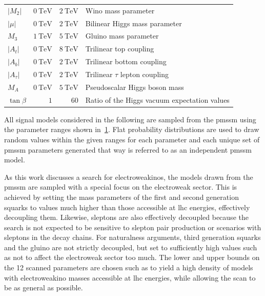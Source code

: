 \begin{table}
\begin{tabular} {l r r l}
		$\vert M_2\vert$ & $\SI{0}{\TeV}$ & $\SI{2}{\TeV}$ & Wino mass parameter \\
		$\vert\mu\vert$ & $\SI{0}{\TeV}$ & $\SI{2}{\TeV}$ & Bilinear Higgs mass parameter \\
		$M_3$ & $\SI{1}{\TeV}$ & $\SI{5}{\TeV}$ & Gluino mass parameter \\
		\midrule
		$\vert A_t\vert$ & $\SI{0}{\TeV}$ & $\SI{8}{\TeV}$ & Trilinear top coupling \\
		$\vert A_b\vert$ & $\SI{0}{\TeV}$ & $\SI{2}{\TeV}$ & Trilinear bottom coupling \\
		$\vert A_\tau\vert$ & $\SI{0}{\TeV}$ & $\SI{2}{\TeV}$ & Trilinear $\tau$ lepton coupling \\
		$M_A$ & $\SI{0}{\TeV}$ & $\SI{5}{\TeV}$ & Pseudoscalar Higgs boson mass \\
		$\tan\beta$ & $1$ & $60$ & Ratio of the Higgs vacuum expectation values \\
		\bottomrule
	\end{tabular}

	\label{fig:pmssm_scan_ranges}   
\end{table}

All signal models considered in the following are sampled from the \gls{pmssm} using the parameter ranges shown in~\cref{fig:pmssm_scan_ranges}. Flat probability distributions are used to draw random values within the given ranges for each parameter and each unique set of \gls{pmssm} parameters generated that way is referred to as an independent \gls{pmssm} model. 

As this work discusses a search for electroweakinos, the models drawn from the \gls{pmssm} are sampled with a special focus on the electroweak sector.
This is achieved by setting the mass parameters of the first and second generation squarks to values much higher than those accessible at \gls{lhc} energies, effectively decoupling them. Likewise, sleptons are also effectively decoupled because the \onelepton search is not expected to be sensitive to slepton pair production or scenarios with sleptons in the decay chains. 
For naturalness arguments, third generation squarks and the gluino are not strictly decoupled, but set to sufficiently high values such as not to affect the electroweak sector too much. 
The lower and upper bounds on the 12 scanned parameters are chosen such as to yield a high density of models with electroweakino masses accessible at \gls{lhc} energies, while allowing the scan to be as general as possible. 

